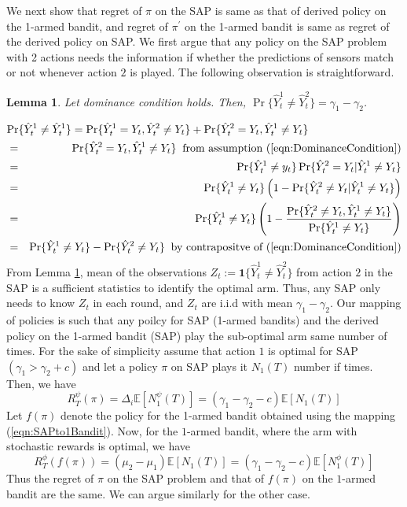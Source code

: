 \documentclass{article}
\newtheorem{lemma}{Lemma}
\begin{document}
We next show that regret of $\pi$ on the SAP is same as that of derived policy on the 1-armed bandit, and  regret of $\pi^\prime$ on the 1-armed bandit is same as regret of the derived policy on SAP. 
We first argue that any policy on the SAP problem with 2 actions needs the information if whether the predictions of sensors match or not whenever action $2$ is played.  The following observation is straightforward.
\begin{lemma}
	\label{lma:SuffStat2Action}
	Let  dominance condition holds. Then, $\Pr\{\hat{Y}^1_t \neq \hat{Y}^2_t\}=\gamma_1-\gamma_2$.
\end{lemma}
\begin{eqnarray}
\lefteqn{\Pr\{\hat{Y}^1_t \neq \hat{Y}^1_t\}=\Pr\{\hat{Y}^1_t=Y_t, \hat{Y}^2_t \neq Y_t\} + \Pr\{\hat{Y}^2_t=Y_t, \hat{Y}^1_t \neq Y_t\}} \\
&=& \Pr\{\hat{Y}^2_t=Y_t, \hat{Y}^1_t \neq Y_t\} \;\;\mbox{from assumption (\ref{eqn:DominanceCondition})}\\
&=& \Pr\{\hat{Y}^1_t\neq y_t\}\Pr\{\hat{Y}^2_t= Y_t| \hat{Y}^1_t\neq Y_t\} \\
&=& \Pr\{\hat{Y}^1_t\neq Y_t\}\left( 1-\Pr\{\hat{Y}^2_t \neq  Y_t| \hat{Y}^1_t\neq Y_t\} \right ) \\
&=& \Pr\{\hat{Y}^1_t\neq Y_t\}\left( 1-\frac{\Pr\{\hat{Y}^2_t \neq  Y_t, \hat{Y}^1_t\neq Y_t\}}{\Pr\{\hat{Y}^1_t\neq Y_t\}} \right )\\
&=& \Pr\{\hat{Y}^1_t\neq Y_t\}-\Pr\{\hat{Y}^2_t \neq  Y_t\}  \;\; \mbox{by contrapositve of  (\ref{eqn:DominanceCondition})} 
\end{eqnarray}
From Lemma \ref{lma:SuffStat2Action}, mean of the observations $Z_t:=\boldsymbol{1}{\{\hat{Y}_t^1 \neq \hat{Y}_t^2 \}}$ from action $2$ in the SAP is a sufficient statistics to identify the optimal arm. Thus, any SAP only needs to know $Z_t$ in each round, and $Z_t$ are i.i.d with mean $\gamma_1-\gamma_2$.  Our mapping of policies is such that any poilcy for SAP (1-armed bandits) and the derived policy on the 1-armed bandit (SAP) play the sub-optimal arm same number of times.  For the sake of simplicity assume that action $1$ is optimal for SAP  $(\gamma_1> \gamma_2 + c)$ and let a policy $\pi$ on SAP plays it $N_1(T)$ number if times. Then, we have
\[ R^\psi_T(\pi)=\Delta_i\mathbb{E}[N^\psi_1(T)]=(\gamma_1-\gamma_2-c)\mathbb{E}[N_1(T)]\]
Let $f(\pi)$ denote the policy for the 1-armed bandit obtained using the mapping (\ref{eqn:SAPto1Bandit}). Now, for the $1$-armed bandit, where the arm with stochastic rewards is optimal, we have
\[ R^\phi_T(f(\pi))=(\mu_2-\mu_1)\mathbb{E}[N_1(T)]=(\gamma_1-\gamma_2-c)\mathbb{E}[N^\phi_1(T)]\]
Thus the regret of $\pi$ on the SAP problem and that of $f(\pi)$ on the $1$-armed bandit are the same. We can argue similarly for the other case. 
\end{document}
